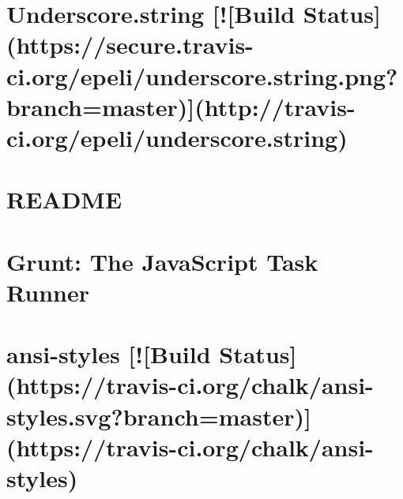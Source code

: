 \documentclass[twoside]{book}
\newcommand{\+}{\discretionary{\mbox{\scriptsize$\hookleftarrow$}}{}{}}
\begin{document}
\chapter{Underscore.\+string \mbox{[}!\mbox{[}Build Status\mbox{]}(https\+://secure.travis-\/ci.org/epeli/underscore.string.\+png?branch=master)\mbox{]}(http\+://travis-\/ci.org/epeli/underscore.string)}
\label{md__c_1__users_martin__documents__git_hub_visual_studio__bachelor__wis_r__wis_r_node_modules_gruc0359081a26c695b1f75630cde05c9ee}
\hypertarget{md__c_1__users_martin__documents__git_hub_visual_studio__bachelor__wis_r__wis_r_node_modules_gruc0359081a26c695b1f75630cde05c9ee}{}

\chapter{R\+E\+A\+D\+M\+E}
\label{md__c_1__users_martin__documents__git_hub_visual_studio__bachelor__wis_r__wis_r_node_modules_gru62e52453635f237e4c0b65ffa3d55586}
\hypertarget{md__c_1__users_martin__documents__git_hub_visual_studio__bachelor__wis_r__wis_r_node_modules_gru62e52453635f237e4c0b65ffa3d55586}{}

\chapter{Grunt\+: The Java\+Script Task Runner}
\label{md__c_1__users_martin__documents__git_hub_visual_studio__bachelor__wis_r__wis_r_node_modules_grunt__r_e_a_d_m_e}
\hypertarget{md__c_1__users_martin__documents__git_hub_visual_studio__bachelor__wis_r__wis_r_node_modules_grunt__r_e_a_d_m_e}{}

\chapter{ansi-\/styles \mbox{[}!\mbox{[}Build Status\mbox{]}(https\+://travis-\/ci.org/chalk/ansi-\/styles.svg?branch=master)\mbox{]}(https\+://travis-\/ci.org/chalk/ansi-\/styles)}
\label{md__c_1__users_martin__documents__git_hub_visual_studio__bachelor__wis_r__wis_r_node_modules_gru51ccdfa8ef3e5585dc40b44c595212c6}
\hypertarget{md__c_1__users_martin__documents__git_hub_visual_studio__bachelor__wis_r__wis_r_node_modules_gru51ccdfa8ef3e5585dc40b44c595212c6}{}

\end{document}
